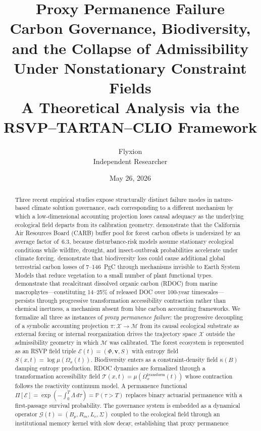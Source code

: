 \documentclass[12pt]{article}
\title{\textbf{Proxy Permanence Failure}\\[0.4em]
\large Carbon Governance, Biodiversity, and the Collapse of Admissibility\\
Under Nonstationary Constraint Fields\\[0.6em]
\normalsize A Theoretical Analysis via the RSVP--TARTAN--CLIO Framework}
\author{Flyxion\\
\small Independent Researcher}
\date{May 26, 2026}
\newcommand{\Ecal}{\mathcal{E}}
\newcommand{\Xcal}{\mathcal{X}}
\newcommand{\Mcal}{\mathcal{M}}
\newcommand{\Gcal}{\mathcal{G}}
\newcommand{\Tcal}{\mathcal{T}}
\begin{document}
\maketitle

\begin{abstract}
Three recent empirical studies expose structurally distinct failure modes in nature-based
climate solution governance, each corresponding to a different mechanism by which a
low-dimensional accounting projection loses causal adequacy as the underlying ecological
field departs from its calibration geometry. \citet{Wu2026} demonstrate that the California
Air Resources Board (CARB) buffer pool for forest carbon offsets is undersized by an
average factor of~6.3, because disturbance-risk models assume stationary ecological
conditions while wildfire, drought, and insect-outbreak probabilities accelerate under
climate forcing. \citet{Weiskopf2024} demonstrate that biodiversity loss could cause
additional global terrestrial carbon losses of 7--146~PgC through mechanisms invisible to
Earth System Models that reduce vegetation to a small number of plant functional types.
\citet{Watanabe2026} demonstrate that recalcitrant dissolved organic carbon (RDOC) from
marine macrophytes---constituting 14--25\% of released DOC over 100-year timescales---
persists through progressive transformation accessibility contraction rather than chemical
inertness, a mechanism absent from blue carbon accounting frameworks. We formalize all
three as instances of \emph{proxy permanence failure}: the progressive decoupling of a
symbolic accounting projection $\pi:\Xcal\to\Mcal$ from its causal ecological substrate as
external forcing or internal reorganization drives the trajectory space $\Xcal$ outside the
admissibility geometry in which $\Mcal$ was calibrated. The forest ecosystem is represented
as an RSVP field triple $\Ecal(t)=(\Phi,\mathbf{v},S)$ with entropy field
$S(x,t)=\log\mu(\Omega_x(t))$. Biodiversity enters as a constraint-density field $\kappa(B)$
damping entropy production. RDOC dynamics are formalized through a transformation
accessibility field $\Tcal(x,t)=\mu(\Omega^\text{transform}_x(t))$ whose contraction
follows the reactivity continuum model. A permanence functional
$\Pi[\Ecal]=\exp(-\int_0^T\Lambda\,d\tau)=\mathbb{P}(\tau>T)$ replaces binary actuarial
permanence with a first-passage survival probability. The governance system is embedded as
a dynamical operator $\Gcal(t)=(B_p,R_m,L_c,\Sigma)$ coupled to the ecological field
through an institutional memory kernel with slow decay, establishing that proxy permanence

\end{abstract}
\end{document}
